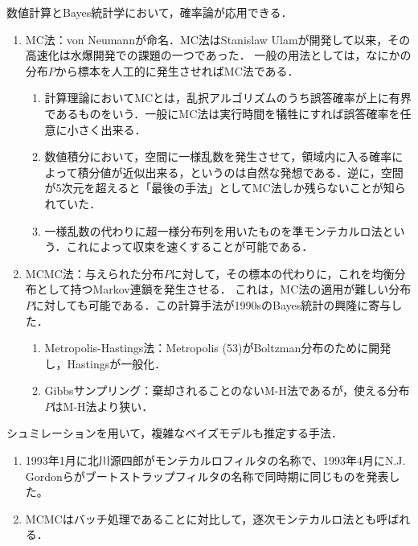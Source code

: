\documentclass[uplatex,dvipdfmx]{jsreport}
\begin{document}
\begin{remarks}[確率過程の発生算譜]
    数値計算とBayes統計学において，確率論が応用できる．
    \begin{enumerate}
        \item MC法：von Neumannが命名．MC法はStanislaw Ulamが開発して以来，その高速化は水爆開発での課題の一つであった．
        一般の用法としては，なにかの分布$P$から標本を人工的に発生させればMC法である．
        \begin{enumerate}
            \item 計算理論においてMCとは，乱択アルゴリズムのうち誤答確率が上に有界であるものをいう．一般にMC法は実行時間を犠牲にすれば誤答確率を任意に小さく出来る．
            \item 数値積分において，空間に一様乱数を発生させて，領域内に入る確率によって積分値が近似出来る，というのは自然な発想である．逆に，空間が5次元を超えると「最後の手法」としてMC法しか残らないことが知られていた．
            \item 一様乱数の代わりに超一様分布列を用いたものを準モンテカルロ法という．これによって収束を速くすることが可能である．
        \end{enumerate}
        \item MCMC法：与えられた分布$P$に対して，その標本の代わりに，これを均衡分布として持つMarkov連鎖を発生させる．
        これは，MC法の適用が難しい分布$P$に対しても可能である．この計算手法が1990sのBayes統計の興隆に寄与した．
        \begin{enumerate}
            \item Metropolis-Hastings法：Metropolis (53)がBoltzman分布のために開発し，Hastingsが一般化．
            \item Gibbsサンプリング：棄却されることのないM-H法であるが，使える分布$P$はM-H法より狭い．
        \end{enumerate}
    \end{enumerate}
\end{remarks}

\begin{remarks}
    シュミレーションを用いて，複雑なベイズモデルも推定する手法．
    \begin{enumerate}
        \item 1993年1月に北川源四郎がモンテカルロフィルタの名称で、1993年4月にN.J. Gordonらがブートストラップフィルタの名称で同時期に同じものを発表した。
        \item MCMCはバッチ処理であることに対比して，逐次モンテカルロ法とも呼ばれる．
    \end{enumerate}
\end{remarks}
\end{document}
